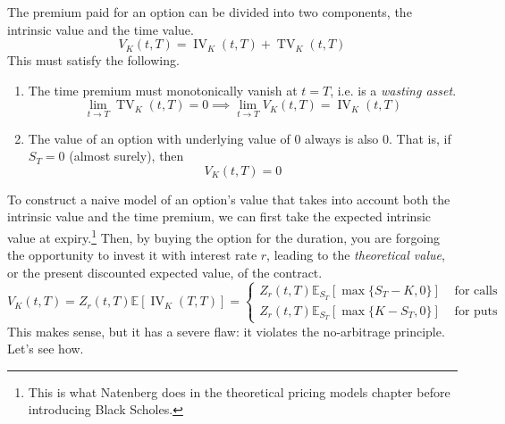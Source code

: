 \documentclass{article}
\DeclareMathOperator{\IV}{IV}
\DeclareMathOperator{\TV}{TV}
\begin{document}
    \begin{theorem}
      The premium paid for an option can be divided into two components, the intrinsic value and the time value. 
      \begin{equation}
        V_K(t, T) = \IV_{K} (t, T) + \TV_K (t, T)
      \end{equation}
      This must satisfy the following. 
      \begin{enumerate}
        \item The time premium must monotonically vanish at $t = T$, i.e. is a \textit{wasting asset}. 
          \begin{equation}
            \lim_{t \rightarrow T} \TV_K (t, T) = 0 \implies \lim_{t \rightarrow T} V_K (t, T) = \IV_K (t, T) 
          \end{equation}
        \item The value of an option with underlying value of $0$ always is also $0$. That is, if $S_T = 0$ (almost surely), then 
          \begin{equation}
            V_K (t, T)  = 0
          \end{equation}
      \end{enumerate}
    \end{theorem}

    To construct a naive model of an option's value that takes into account both the intrinsic value and the time premium, we can first take the expected intrinsic value at expiry.\footnote{This is what Natenberg does in the theoretical pricing models chapter before introducing Black Scholes.} Then, by buying the option for the duration, you are forgoing the opportunity to invest it with interest rate $r$, leading to the \textit{theoretical value}, or the present discounted expected value, of the contract. 
    \begin{equation}
      V_K (t, T) = Z_r (t, T) \mathbb{E} [\IV_K(T, T)]  = \begin{cases} 
        Z_r (t, T) \mathbb{E}_{S_T} [ \max\{S_T - K, 0 \}] & \text{ for calls} \\ 
        Z_r (t, T) \mathbb{E}_{S_T} [ \max\{K - S_T, 0 \}] & \text{ for puts}
      \end{cases}
    \end{equation}
    This makes sense, but it has a severe flaw: it violates the no-arbitrage principle. Let's see how. 
\end{document}
